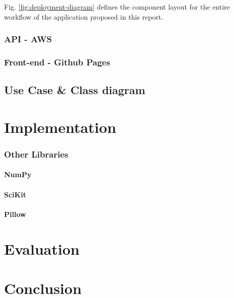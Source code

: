 \documentclass[a4paper,12pt]{report}
\begin{document}
      Fig. \ref{fig:deployment-diagram} defines the component layout for the entire workflow of the application proposed in this report.

      \subsection{API - AWS}

      \subsection{Front-end - Github Pages}

    \section{Use Case \& Class diagram}


\chapter{Implementation}

      \subsection{Other Libraries}

        \subsubsection{NumPy} \label{sec:numpy}

        \subsubsection{SciKit} \label{sec:scikit}

        \subsubsection{Pillow} \label{sec:pillow}

\chapter{Evaluation}

\chapter{Conclusion}

\newpage
\singlespacing



\end{document}
